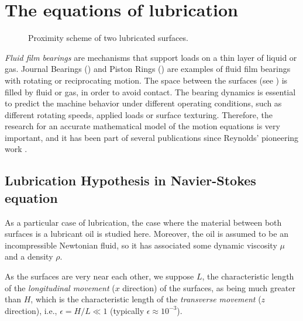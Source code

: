 \chapter{The equations of lubrication}
\label{chap:equations_lubrication} %


 \begin{figure}[ht!]
 \centering 
 \def\svgwidth{\textwidth}\small{
}\caption[Two parallel lubricated surfaces scheme]{Proximity scheme of two lubricated surfaces.}\label{fig:lubscheme}
\end{figure}

\emph{Fluid film bearings} are mechanisms that support loads on a thin layer of liquid or gas. Journal Bearings () and Piston Rings () are examples of fluid film bearings with rotating or reciprocating motion. The space between the surfaces (see ) is filled by fluid or gas, in order to avoid contact. The bearing dynamics is essential to predict the machine behavior under different operating conditions, such as different rotating speeds, applied loads or surface texturing. Therefore, the research for an accurate mathematical model of the motion equations is very important, and it has been part of several publications since Reynolds' pioneering work \cite{reynolds1866}.

\section{Lubrication Hypothesis in Navier-Stokes equation}\label{sec:lub_hyp_in_nvs}
As a particular case of lubrication, the case where the material between both surfaces is a lubricant oil is studied here. Moreover, the oil is assumed to be an incompressible Newtonian fluid, so it has associated some dynamic viscosity $\mu$ and a density $\rho$.

As the surfaces are very near each other, we suppose $L$, the characteristic length of the \emph{longitudinal movement} ($x$ direction) of the surfaces, as being much greater than $H$, which is the characteristic length of the \emph{transverse movement} ($z$ direction), i.e., $\epsilon=H/L\ll 1$ (typically $\epsilon \approx 10^{-3}$). 

